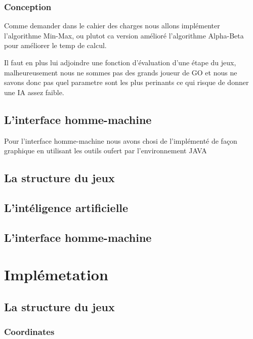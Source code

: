 \documentclass[12pt,a4paper,utf8x]{report}
\begin{document}
\begin{onehalfspace}
	\subsection{Conception}

		Comme demander dans le cahier des charges nous allons implémenter l'algorithme Min-Max, ou plutot ca version amélioré l'algorithme Alpha-Beta pour améliorer le temp de calcul.
		
		Il faut en plus lui adjoindre une fonction d'évaluation d'une étape du jeux, malheureusement nous ne sommes pas des grands joueur de GO et nous ne savons donc pas quel parametre
		sont les plus perinants ce qui risque de donner une IA assez faible.
	
\section{L'interface homme-machine}

		Pour l'interface homme-machine nous avons chosi de l'implémenté de façon graphique en utilisant les outils oufert par l'environnement JAVA
		
\clearpage


\section{La structure du jeux}

\section{L'intéligence artificielle}

\section{L'interface homme-machine}

\clearpage







\chapter{Implémetation}

	\section{La structure du jeux}
	
		\subsection{Coordinates}
			

\end{onehalfspace}
\end{document}
